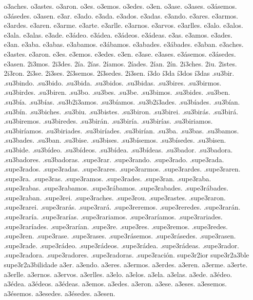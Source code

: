 {o3aches. o3astes. o3aron.
o3es. o3emos. o3edes. o3en.
o3ase. o3ases. o3ásemos. o3ásedes. o3asen.
%
e3ar. e3ado. e3ada. e3ados. e3adas. e3ando.
e3ares. e3armos. e3ardes. e3aren.
e3arme. e3arte. e3arlle. e3arnos. e3arvos. e3arlles.
e3alo. e3alos. e3ala. e3alas.
e3ade. e3ádeo. e3ádea. e3ádeos. e3ádeas.
e3as. e3amos. e3ades. e3an.
e3aba. e3abas. e3abamos. e3ábamos. e3abades. e3ábades. e3aban.
e3aches. e3astes. e3aron.
e3es. e3emos. e3edes. e3en.
e3ase. e3ases. e3ásemos. e3ásedes. e3asen.
%
2i3mos. 2i3des.
2ía. 2ías. 2íamos. 2íades. 2ían.
2ín. 2i3ches. 2iu. 2istes. 2i3ron.
2i3se. 2i3ses. 2í3semos. 2í3sedes. 2i3sen.
%
í3do í3da í3dos í3das
%
.su3bir. .su3bindo. .su3bido. .su3bida. .su3bidos. .su3bidas.
.su3bires. .su3birmos. .su3birdes. .su3biren.
.su3bo. .su3bes. .su3be. .su3bimos. .su3bides. .su3ben.
.su3bía. .su3bías. .su3b2i3amos. .su3bíamos. .su3b2i3ades. .su3bíades. .su3bían.
.su3bín. .su3biches. .su3biu. .su3bistes. .su3biron.
.su3birei. .su3birás. .su3birá. .su3biremos. .su3biredes. .su3birán.
.su3biría. .su3birías. .su3biriamos. .su3biríamos. .su3biriades. .su3biríades. .su3birían.
.su3ba. .su3bas. .su3bamos. .su3bades. .su3ban.
.su3bise. .su3bises. .su3bísemos. .su3bísedes. .su3bisen.
.su3bide. .su3bídeo. .su3bídeos. .su3bídea. .su3bídeas.
.su3bador. .su3badora. .su3badores. .su3badoras.
%
.supe3rar. .supe3rando. .supe3rado. .supe3rada. .supe3rados. .supe3radas.
.supe3rares. .supe3rarmos. .supe3rardes. .supe3raren.
.supe3ra. .supe3ras. .supe3ramos. .supe3rades. .supe3ran.
.supe3raba. .supe3rabas. .supe3rabamos. .supe3rábamos. .supe3rabades. .supe3rábades. .supe3raban.
.supe3rei. .supe3raches. .supe3rou. .supe3rastes. .supe3raron.
.supe3rarei. .supe3rarás. .supe3rará. .supe3reremos. .supe3reredes. .supe3rarán.
.supe3raría. .supe3rarías. .supe3rariamos. .supe3raríamos. .supe3rariades. .supe3raríades. .supe3rarían.
.supe3re. .supe3res. .supe3remos. .supe3redes. .supe3ren.
.supe3rase. .supe3rases. .supe3rásemos. .supe3rásedes. .supe3rasen.
.supe3rade. .supe3rádeo. .supe3rádeos. .supe3rádea. .supe3rádeas.
.supe3rador. .supe3radora. .supe3radores. .supe3radoras. .supe3ración.
supe3r2ior supe3r2a3ble supe3r2a3bilidade
%
a3er. a3endo.
a3eres. a3ermos. a3erdes. a3eren.
a3erme. a3erte. a3erlle. a3ernos. a3ervos. a3erlles.
a3elo. a3elos. a3ela. a3elas.
a3ede. a3édeo. a3édea. a3édeos. a3édeas.
a3emos. a3edes. a3eron.
a3ese. a3eses. a3esemos. a3ésemos. a3esedes. a3ésedes. a3esen.
}
